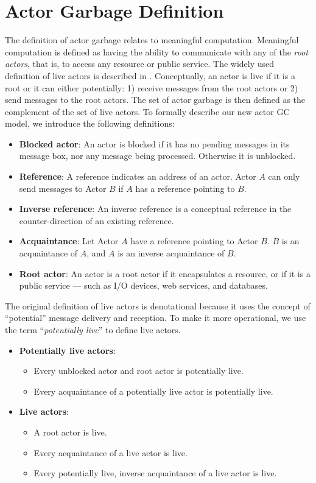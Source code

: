 \section{Actor Garbage Definition}
The definition of actor garbage relates to meaningful computation. 
Meaningful computation is 
defined as having the ability to communicate with any of the \emph{root actors},
that is, to access any resource or public service. The widely used 
definition of live actors is described in \cite{kafura-actorGCdef-91}.
Conceptually, an actor is live if it is a root or it can either potentially: 
1) receive messages from the root actors or 2) send messages to the root 
actors. The set of actor garbage is then defined as the complement of the set of live 
actors. To formally describe our new actor GC model, we introduce the
following definitions:
\begin{itemize}
\item {\bf Blocked actor}:
An actor is blocked if it has no pending messages in 
its message box, nor any message being processed. Otherwise
it is unblocked.
\item {\bf Reference}:
A reference indicates an address 
of an actor. Actor $A$ can only send messages to Actor $B$ if $A$ 
has a reference pointing to $B$.
\item {\bf Inverse reference}:
An inverse reference is a conceptual reference
in the counter-direction of an existing reference. 
\item {\bf Acquaintance}:
Let Actor $A$ have a reference pointing to Actor $B$.
$B$ is an acquaintance of $A$, and $A$ is
an inverse acquaintance of $B$.
\item {\bf Root actor}:
An actor is a root actor if it encapsulates a resource, or 
if it is a public service --- such as I/O devices, web services, and 
databases.
\end{itemize}

The original definition of live actors
is denotational because it uses the concept of {\textquotedblleft}potential{\textquotedblright} message 
delivery and reception. To make it more operational, we use 
the term {\textquotedblleft}\emph{potentially live}{\textquotedblright} \cite{dick96} to define live actors.
\begin{itemize}
\item {{\bf Potentially live actors}: 
\begin{itemize}
\item Every unblocked actor and root actor is potentially live. 
\item Every acquaintance of a potentially live actor 
  is potentially live. 
\end{itemize}}
\item {{\bf Live actors}:
\begin{itemize}
\item A root actor is live. 
\item Every acquaintance of a live actor is live.
\item Every potentially live, inverse acquaintance of a live 
  actor is live.
\end{itemize}}
\end{itemize}

